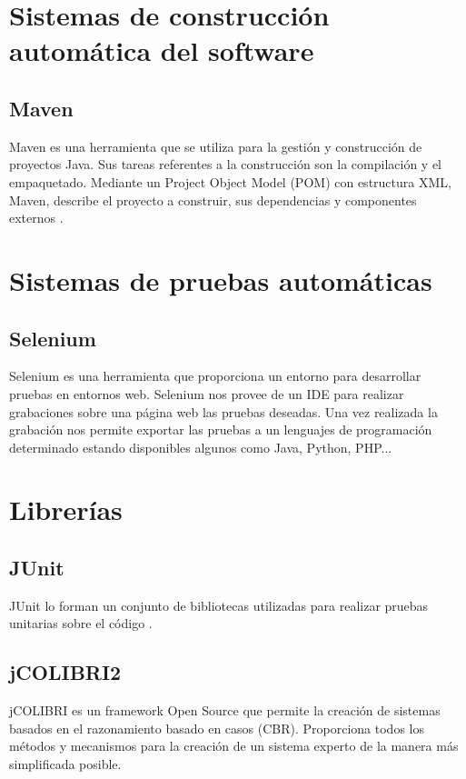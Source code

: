 \section{Sistemas de construcción automática del software}

\subsection{Maven}

Maven es una herramienta que se utiliza para la gestión y construcción de proyectos Java. Sus tareas referentes a la construcción son la compilación y el empaquetado. Mediante un Project Object Model (POM) con estructura XML, Maven, describe el proyecto a construir, sus dependencias y componentes externos \cite{maven:wiki}. 

\section{Sistemas de pruebas automáticas}

\subsection{Selenium}

Selenium es una herramienta que proporciona un entorno para desarrollar pruebas en entornos web. Selenium nos provee de un IDE para realizar grabaciones sobre una página web las pruebas deseadas. Una vez realizada la grabación nos permite exportar las pruebas a un lenguajes de programación determinado estando disponibles algunos como Java, Python, PHP... \cite{selenium:wiki}

\section{Librerías}

\subsection{JUnit}

JUnit lo forman un conjunto de bibliotecas utilizadas para realizar pruebas unitarias sobre el código \cite{junit:wiki}.

\subsection{jCOLIBRI2}

jCOLIBRI es un framework Open Source que permite la creación de sistemas basados en el razonamiento basado en casos (CBR). Proporciona todos los métodos y mecanismos para la creación de un sistema experto de la manera más simplificada posible.

